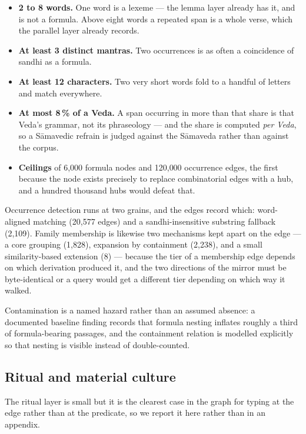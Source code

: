 \begin{itemize}[leftmargin=1.9em,itemsep=1pt,topsep=2pt]
\item \textbf{2 to 8 words.} One word is a lexeme --- the lemma layer already has it,
and  is not a formula. Above eight words a repeated span is a whole verse,
which the parallel layer already records.
\item \textbf{At least 3 distinct mantras.} Two occurrences is as often a coincidence
of sandhi as a formula.
\item \textbf{At least 12 characters.} Two very short words fold to a handful of
letters and match everywhere.
\item \textbf{At most 8\,\% of a Veda.} A span occurring in more than that share is
that Veda's grammar, not its phraseology --- and the share is computed \emph{per
Veda}, so a S\=amavedic refrain is judged against the S\=amaveda rather than against
the corpus.
\item \textbf{Ceilings} of 6{,}000 formula nodes and 120{,}000 occurrence edges, the
first because the node exists precisely to replace combinatorial edges with a hub,
and a hundred thousand hubs would defeat that.
\end{itemize}

Occurrence detection runs at two grains, and the edges record which: word-aligned
matching (20{,}577 edges) and a sandhi-insensitive substring fallback (2{,}109).
Family membership is likewise two mechanisms kept apart on the edge --- a core
grouping (1{,}828), expansion by containment (2{,}238), and a small
similarity-based extension (8) --- because the tier of a membership edge depends on
which derivation produced it, and the two directions of the mirror must be
byte-identical or a query would get a different tier depending on which way it
walked.

Contamination is a named hazard rather than an assumed absence: a documented
baseline finding records that formula nesting inflates roughly a third of
formula-bearing passages, and the containment relation is modelled explicitly so
that nesting is visible instead of double-counted.

\subsection{Ritual and material culture}
\label{sec:ritual}

The ritual layer is small but it is the clearest case in the graph for typing at the
edge rather than at the predicate, so we report it here rather than in an appendix.

